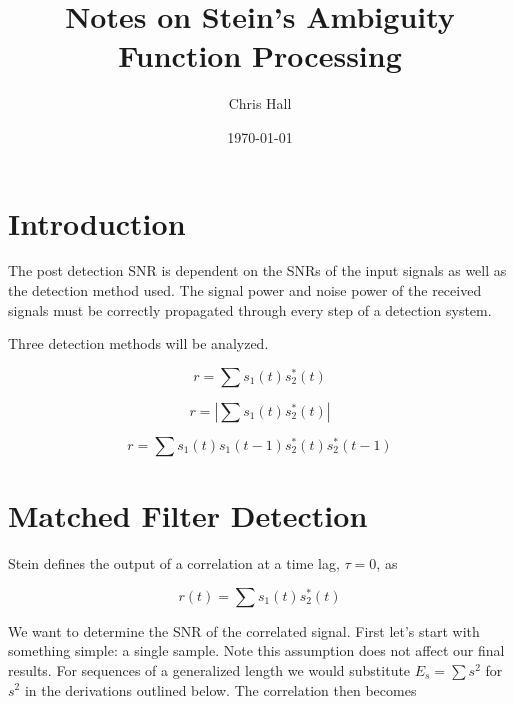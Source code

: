 \documentclass[11pt]{article}
\title{ Notes on Stein's Ambiguity Function Processing}
\author{ Chris Hall }
\date{\today}
\begin{document}
\maketitle  





\section{Introduction}

The post detection SNR is dependent on the SNRs of the input signals as well as the detection method used.
The signal power and noise power of the received signals must be correctly propagated through every step of a detection system.

Three detection methods will be analyzed.

\begin{equation}
r = \sum s_1(t) s_2^*(t)
\end{equation}

\begin{equation}
r = |\sum s_1(t) s_2^*(t)|
\end{equation}

\begin{equation}
r = \sum s_1(t)s_1(t-1) s_2^*(t) s_2^*(t-1)
\end{equation}

\section{Matched Filter Detection}

Stein defines the output of a correlation at a time lag, $\tau=0$, as

\begin{equation}
r(t) = \sum s_1(t)s^{*}_2(t)
\end{equation}


We want to determine the SNR of the correlated signal. First let's start with something simple: a single sample. Note this assumption does not affect our final results. For sequences of a generalized length we would substitute $E_s = \sum s^2$ for $s^2$ in the derivations outlined below. The correlation then becomes
\end{document}

